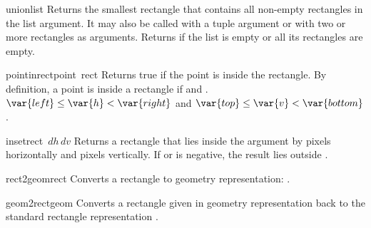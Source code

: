\begin{funcdesc}{union}{list}
Returns the smallest rectangle that contains all non-empty rectangles in
the list argument.
It may also be called with a tuple argument or with two or more
rectangles as arguments.
Returns
if the list is empty or all its rectangles are empty.
\end{funcdesc}

\begin{funcdesc}{pointinrect}{point\, rect}
Returns true if the point is inside the rectangle.
By definition, a point
is inside a rectangle
 if
\iftexi
{} and
.
\else
$\var{left} \leq \var{h} < \var{right}$ and
$\var{top} \leq \var{v} < \var{bottom}$.
\fi
\end{funcdesc}

\begin{funcdesc}{inset}{rect\, \(dh\, dv\)}
Returns a rectangle that lies inside the
argument by
pixels horizontally
and
pixels
vertically.
If
or
is negative, the result lies outside
.
\end{funcdesc}

\begin{funcdesc}{rect2geom}{rect}
Converts a rectangle to geometry representation:
.
\end{funcdesc}

\begin{funcdesc}{geom2rect}{geom}
Converts a rectangle given in geometry representation back to the
standard rectangle representation
.
\end{funcdesc}
